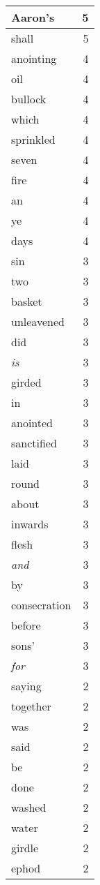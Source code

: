 \begin{center}
\begin{longtable}{l|r}
Aaron's & 5 \\ \hline
shall & 5 \\ \hline
anointing & 4 \\ \hline
oil & 4 \\ \hline
bullock & 4 \\ \hline
which & 4 \\ \hline
sprinkled & 4 \\ \hline
seven & 4 \\ \hline
fire & 4 \\ \hline
an & 4 \\ \hline
ye & 4 \\ \hline
days & 4 \\ \hline
sin & 3 \\ \hline
two & 3 \\ \hline
basket & 3 \\ \hline
unleavened & 3 \\ \hline
did & 3 \\ \hline
\emph{is} & 3 \\ \hline
girded & 3 \\ \hline
in & 3 \\ \hline
anointed & 3 \\ \hline
sanctified & 3 \\ \hline
laid & 3 \\ \hline
round & 3 \\ \hline
about & 3 \\ \hline
inwards & 3 \\ \hline
flesh & 3 \\ \hline
\emph{and} & 3 \\ \hline
by & 3 \\ \hline
consecration & 3 \\ \hline
before & 3 \\ \hline
sons' & 3 \\ \hline
\emph{for} & 3 \\ \hline
saying & 2 \\ \hline
together & 2 \\ \hline
was & 2 \\ \hline
said & 2 \\ \hline
be & 2 \\ \hline
done & 2 \\ \hline
washed & 2 \\ \hline
water & 2 \\ \hline
girdle & 2 \\ \hline
ephod & 2 \\ \hline

\end{longtable}
\end{center}
